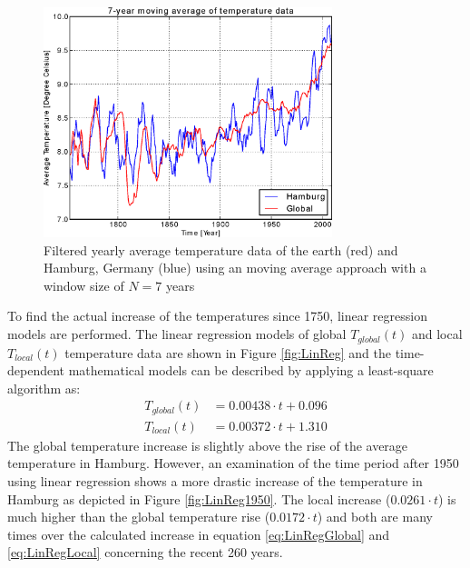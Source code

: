 \documentclass[a4paper]{article}
\begin{document}
\begin{figure}
\centering
\includegraphics[width=0.75\textwidth]{WeatherTrendsFiltered.eps}
\caption{\label{fig:filtered}Filtered yearly average temperature data of the earth (red) and Hamburg, Germany (blue) using an moving average approach with a window size of $N=7$ years}
\end{figure}
To find the actual increase of the temperatures since 1750, linear regression models are performed. The linear regression models of global $T_{global}(t)$ and local $T_{local}(t)$ temperature data are shown in Figure \ref{fig:LinReg} and the time-dependent mathematical models can be described by applying a least-square algorithm as:
\begin{align}
T_{global}(t)&= 0.00438\cdot t + 0.096 \label{eq:LinRegGlobal}\\
T_{local}(t) &= 0.00372\cdot t + 1.310 \label{eq:LinRegLocal}
\end{align}
The global temperature increase is slightly above the rise of the average temperature in Hamburg. However, an examination of the time period after 1950 using linear regression shows a more drastic increase of the temperature in Hamburg as depicted in Figure \ref{fig:LinReg1950}. The local increase ($0.0261\cdot t$) is much higher than the global temperature rise ($0.0172\cdot t$) and both are many times over the calculated increase in equation \ref{eq:LinRegGlobal} and \ref{eq:LinRegLocal} concerning the recent 260 years.
\end{document}
